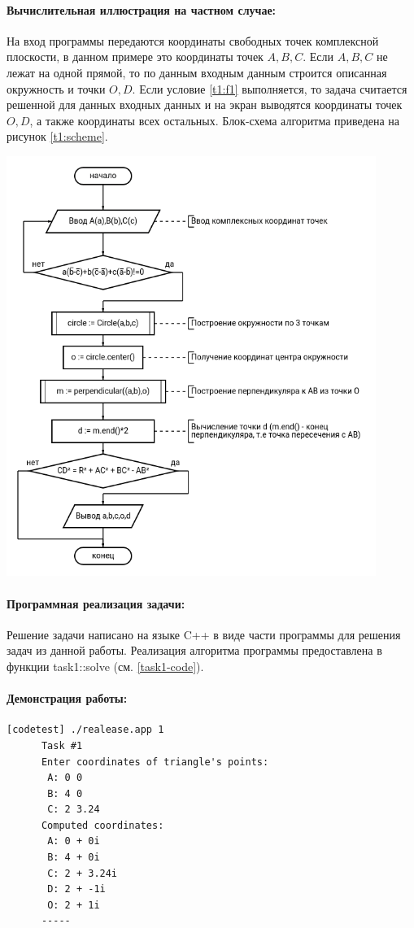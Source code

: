 {   \paragraph{Вычислительная иллюстрация на частном случае:}
   На вход программы передаются координаты свободных точек комплексной плоскости, в данном примере это
   координаты точек \(A,B,C\). Если \(A,B,C\) не лежат на одной прямой, то по данным входным данным
   строится описанная окружность и точки \(O, D\). Если условие \ref{t1:f1} выполняется, то задача
   считается решенной для данных входных данных и на экран выводятся координаты точек \(O, D\), а также
   координаты всех остальных. Блок-схема алгоритма приведена на рисунок \ref{t1:scheme}.
   \begin{center}
      \includegraphics[width=0.9\textwidth]{images/task1-diagram.png}
      \label{t1:scheme}
   \end{center}
   \paragraph{Программная реализация задачи:}
   Решение задачи написано на языке C++ в виде части программы для решения задач из данной работы.
   Реализация алгоритма программы предоставлена в функции task1::solve (см. \ref{task1-code}).
   \paragraph{Демонстрация работы:}
   \vphantom{code}
   \begin{lstlisting}[language={},frame=none]
      [codetest] ./realease.app 1
      Task #1
      Enter coordinates of triangle's points:
       A: 0 0
       B: 4 0
       C: 2 3.24
      Computed coordinates:
       A: 0 + 0i
       B: 4 + 0i
       C: 2 + 3.24i
       D: 2 + -1i
       O: 2 + 1i
      -----
   \end{lstlisting}
}
